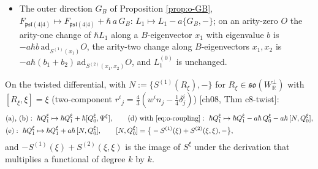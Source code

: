 \begin{proposition}
\begin{itemize}
\begin{equation}
G=S-S^{(2)}=\frac{d}{d\mu}\Big|_{\mu=1}\big(\mu S+S^{(1)}+\mu^{-1}S^{(2)}\big),
\label{eq:o-coupling}
\end{equation}
since $\mu S+S^{(1)}+\mu^{-1}S^{(2)}$ solves [ch02, eq:c2-mc] for every $\mu$; it changes $\hbar L_1^{(0)}$ by $-a\hbar\{S,-\}=-a\hbar(Q+\{I,-\})$, which vanishes on gauge-invariant $O$, leaves $L_1^{(1)}$ unchanged and changes $\hbar L_1^{(2)}(x_1,x_2)$ by $+a\hbar\,\mathrm{ad}_{S^{(2)}(x_1,x_2)}$.
\item[(e)] The outer direction $G_B$ of Proposition \ref{prop:o-GB}, $F_{\mathfrak{psl}(4|4)}\mapsto F_{\mathfrak{psl}(4|4)}+\hbar\,a\,G_B$: $L_1\mapsto L_1-a\{G_B,-\}$; on an arity-zero $O$ the arity-one change of $\hbar L_1$ along a $B$-eigenvector $x_1$ with eigenvalue $b$ is $-a\hbar b\,\mathrm{ad}_{S^{(1)}(x_1)}O$, the arity-two change along $B$-eigenvectors $x_1,x_2$ is $-a\hbar(b_1+b_2)\,\mathrm{ad}_{S^{(2)}(x_1,x_2)}O$, and $L_1^{(0)}$ is unchanged.
\end{itemize}
On the twisted differential, with $N:=\{S^{(1)}(R_\xi),-\}$ for $R_\xi\in\mathfrak{so}(W_{\mathbb R}^\perp)$ with $[R_\xi,\xi]=\xi$ (two-component $r^i{}_j=\tfrac43(w^in_j-\tfrac14\delta^i_j)$) [ch08, Thm c8-twist]:
\begin{equation}
\begin{aligned}
&\text{(a), (b)}:\ \hbar Q^\xi_1\mapsto\hbar Q^\xi_1+\hbar[Q^\xi_0,\Psi^\xi],\qquad \text{(d) with \eqref{eq:o-coupling}}:\ \hbar Q^\xi_1\mapsto\hbar Q^\xi_1-a\hbar\,Q^\xi_0-a\hbar\,[N,Q^\xi_0],\\
&\text{(e)}:\ \hbar Q^\xi_1\mapsto\hbar Q^\xi_1+a\hbar\,[N,Q^\xi_0],\qquad [N,Q^\xi_0]=\big\{-S^{(1)}(\xi)+S^{(2)}(\xi,\xi),-\big\},
\end{aligned}
\label{eq:o-twistlaws}
\end{equation}
and $-S^{(1)}(\xi)+S^{(2)}(\xi,\xi)$ is the image of $S^\xi$ under the derivation that multiplies a functional of degree $k$ by $k$.
\end{proposition}


